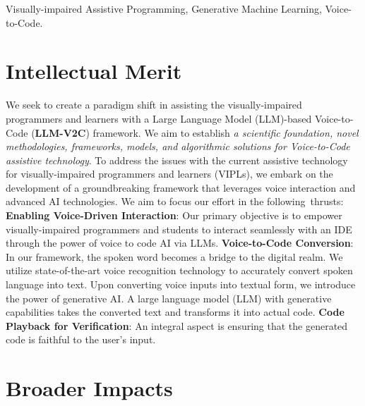 \documentclass[11pt]{article}
\begin{document}

 Visually-impaired Assistive Programming, Generative
Machine Learning, Voice-to-Code.

\section{Intellectual Merit}

We seek to create a paradigm shift in assisting the visually-impaired
programmers and learners with a Large Language Model
(LLM)-based Voice-to-Code ({\bf LLM-V2C}) framework. We aim to establish {\em
  a scientific foundation, novel methodologies, frameworks, models,
  and algorithmic solutions for Voice-to-Code assistive technology}.
%
To address the issues with the current assistive technology for
visually-impaired programmers and learners (VIPLs), we embark on the
development of a groundbreaking framework that leverages voice
interaction and advanced AI technologies. We aim to focus our effort
in the following~thrusts: {\bf Enabling Voice-Driven Interaction}: Our
primary objective is to empower visually-impaired programmers and
students to interact seamlessly with an IDE through the power of voice
to code AI via LLMs. {\bf Voice-to-Code Conversion}: In our framework,
the spoken word becomes a bridge to the digital realm. We utilize
state-of-the-art voice recognition technology to accurately convert
spoken language into text. Upon converting voice inputs into textual
form, we introduce the power of generative AI. A large language model
(LLM) with generative capabilities takes the converted text and
transforms it into actual code. {\bf Code Playback for Verification}:
An integral aspect is ensuring that the generated code is faithful to
the user's input.
 
\section{Broader Impacts}
\end{document}
